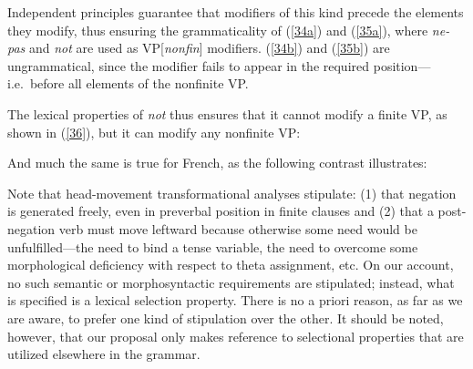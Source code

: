 \documentclass[output=paper]{langsci/langscibook}
\begin{document}
{\begin{exe}
\begin{xlist}
\begin{exe}
\begin{xlist}
\noindent Independent principles guarantee that modifiers of this
kind precede the elements they modify, thus ensuring the
grammaticality of (\ref{34a}) and (\ref{35a}), where {\it ne-pas} and {\it not} are used as VP[{\it nonfin}] modifiers.
(\ref{34b}) and (\ref{35b}) are ungrammatical, since
the modifier fails to appear in the required position---i.e.\
before all elements of the nonfinite VP.

The lexical properties of {\it not} thus ensures that it cannot
modify a finite VP, as shown in (\ref{36}), but it can modify any
nonfinite VP:

\eal\label{36}
\zl




\noindent And much the same is true for French, as the
following contrast illustrates:

\eal
{}
\zl


Note that head-movement transformational analyses stipulate: (1) that negation
is generated freely, even in preverbal position in finite clauses and (2) that
a post-negation verb must move leftward because otherwise some need would be
unfulfilled---the need to bind a tense variable, the need to overcome some
morphological deficiency with respect to theta assignment, etc. On our
account, no such semantic or morphosyntactic requirements are stipulated;
instead, what is specified is a lexical selection property. There is no a
priori reason, as far as we are aware, to prefer one kind of stipulation over
the other. It should be noted, however, that our proposal only makes reference
to selectional properties that are utilized elsewhere in the grammar.



\end{xlist}
\end{exe}
\end{xlist}
\end{exe}}
\end{document}
